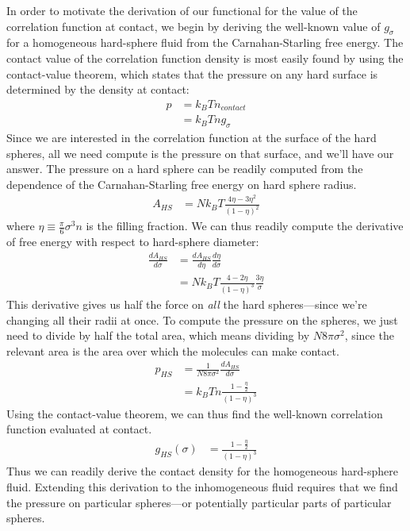 \documentclass[letterpaper,twocolumn,amsmath,amssymb,jcp,10pt,aip]{revtex4-1}
\begin{document}
In order to motivate the derivation of our functional for the value of
the correlation function at contact, we begin by deriving the
well-known value of $g_\sigma$ for a homogeneous hard-sphere fluid
from the Carnahan-Starling free energy.  The contact value of the
correlation function density is most easily found by using the
contact-value theorem, which states that the pressure on any hard
surface is determined by the density at contact:
\begin{align}
  p &= k_BT n_\textit{contact} \\
  &= k_BT n g_\sigma
\end{align}
Since we are interested in the correlation function at the surface of
the hard spheres, all we need compute is the pressure on that surface,
and we'll have our answer.  The pressure on a hard sphere can be
readily computed from the dependence of the Carnahan-Starling free
energy on hard sphere radius.
\begin{align}
  A_{HS} &= Nk_BT \frac{4\eta - 3\eta^2}{(1-\eta)^2}
\end{align}
where $\eta \equiv \frac{\pi}{6} \sigma^3 n$ is the filling fraction.  We
can thus readily compute the derivative of free energy with respect to
hard-sphere diameter:
\begin{align}
  \frac{dA_{HS}}{d\sigma} &= \frac{dA_{HS}}{d\eta} \frac{d\eta}{d\sigma} \\
  &= Nk_BT \frac{4 - 2\eta}{(1-\eta)^3} \frac{3 \eta}{\sigma} \label{eq:dAhsdR}
\end{align}
This derivative gives us half the force on \emph{all} the hard
spheres---since we're changing all their radii at once.  To compute
the pressure on the spheres, we just need to divide by half the total
area, which means dividing by $N 8\pi \sigma^2$, since the relevant
area is the area over which the molecules can make contact.
\begin{align}
  p_{HS} &= \frac{1}{N 8\pi \sigma^2} \frac{dA_{HS}}{d\sigma} \\
  &= k_BT n \frac{1 - \frac{\eta}2}{(1-\eta)^3}
\end{align}
Using the contact-value theorem, we can thus find the well-known
correlation function evaluated at contact.
\begin{align}
  g_{HS}(\sigma) &= \frac{1 - \frac{\eta}2}{(1-\eta)^3} \label{eq:cs-g}
\end{align}
Thus we can readily derive the contact density for the homogeneous
hard-sphere fluid.  Extending this derivation to the inhomogeneous
fluid requires that we find the pressure on particular spheres---or
potentially particular parts of particular spheres.
\end{document}
